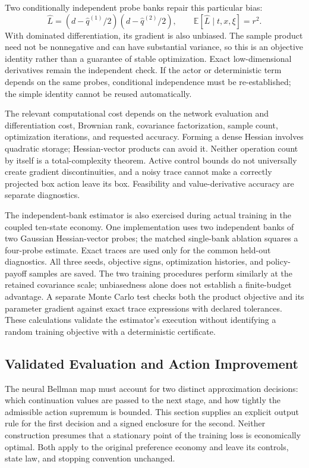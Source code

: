 \documentclass[ecta,nameyear,draft]{econsocart}
\theoremstyle{definition}
\theoremstyle{remark}
\newcommand{\E}{\mathbb E}
\begin{document}
Two conditionally independent probe banks repair this particular bias:
\begin{equation}\label{eq:crossprobe}
 \widehat L=(d-\widehat q^{(1)}/2)(d-\widehat q^{(2)}/2),
 \qquad\E[\widehat L\mid t,x,\xi]=r^2.
\end{equation}
With dominated differentiation, its gradient is also unbiased. The sample product need not be nonnegative and can have substantial variance, so this is an objective identity rather than a guarantee of stable optimization. Exact low-dimensional derivatives remain the independent check. If the actor or deterministic term depends on the same probes, conditional independence must be re-established; the simple identity cannot be reused automatically.

The relevant computational cost depends on the network evaluation and differentiation cost, Brownian rank, covariance factorization, sample count, optimization iterations, and requested accuracy. Forming a dense Hessian involves quadratic storage; Hessian-vector products can avoid it. Neither operation count by itself is a total-complexity theorem. Active control bounds do not universally create gradient discontinuities, and a noisy trace cannot make a correctly projected box action leave its box. Feasibility and value-derivative accuracy are separate diagnostics.


The independent-bank estimator is also exercised during actual training in the coupled ten-state economy. One implementation uses two independent banks of two Gaussian Hessian-vector probes; the matched single-bank ablation squares a four-probe estimate. Exact traces are used only for the common held-out diagnostics. All three seeds, objective signs, optimization histories, and policy-payoff samples are saved. The two training procedures perform similarly at the retained covariance scale; unbiasedness alone does not establish a finite-budget advantage. A separate Monte Carlo test checks both the product objective and its parameter gradient against exact trace expressions with declared tolerances. These calculations validate the estimator's execution without identifying a random training objective with a deterministic certificate.




\subsection{Validated Evaluation and Action Improvement}\label{sec:r9method}
The neural Bellman map must account for two distinct approximation decisions: which continuation values are passed to the next stage, and how tightly the admissible action supremum is bounded. This section supplies an explicit output rule for the first decision and a signed enclosure for the second. Neither construction presumes that a stationary point of the training loss is economically optimal. Both apply to the original preference economy and leave its controls, state law, and stopping convention unchanged.
\end{document}
